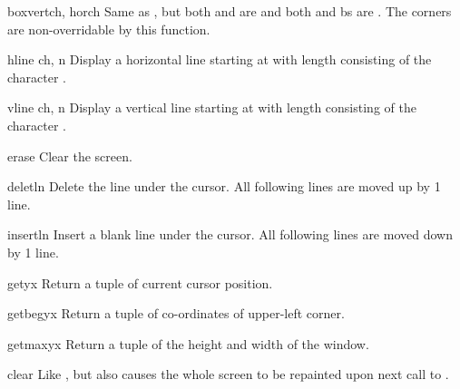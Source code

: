 \begin{methoddesc}{box}{vertch, horch}
Same as , but both  and  are 
and both  and {bs} are . The corners are non-overridable
by this function.
\end{methoddesc}

\begin{methoddesc}{hline}{ ch, n}
Display a horizontal line starting at  with
length  consisting of the character .
\end{methoddesc}

\begin{methoddesc}{vline}{ ch, n}
Display a vertical line starting at  with
length  consisting of the character .
\end{methoddesc}

\begin{methoddesc}{erase}{}
Clear the screen.
\end{methoddesc}

\begin{methoddesc}{deletln}{}
Delete the line under the cursor. All following lines are moved up
by 1 line.
\end{methoddesc}

\begin{methoddesc}{insertln}{}
Insert a blank line under the cursor. All following lines are moved
down by 1 line.
\end{methoddesc}

\begin{methoddesc}{getyx}{}
Return a tuple  of current cursor position.
\end{methoddesc}

\begin{methoddesc}{getbegyx}{}
Return a tuple  of co-ordinates of upper-left
corner.
\end{methoddesc}

\begin{methoddesc}{getmaxyx}{}
Return a tuple  of the height and width of
the window.
\end{methoddesc}

\begin{methoddesc}{clear}{}
Like , but also causes the whole screen to be repainted
upon next call to .
\end{methoddesc}

